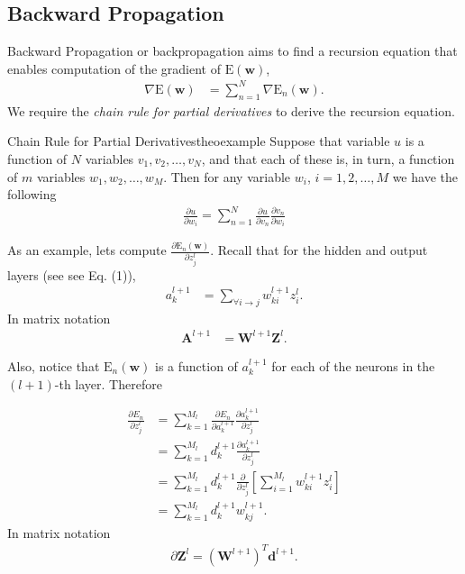 \documentclass{tufte-handout}
\begin{document}
\subsection{Backward Propagation}

Backward Propagation or backpropagation aims to find a recursion equation that enables computation of the gradient of $\mathrm E(\mathbf w)$, 
\begin{align*}
\nabla \mathrm E(\mathbf w) &=  \sum_{n=1}^N \nabla  \mathrm E_n(\mathbf w).
\end{align*}
We require the {\em chain rule for partial derivatives} to derive the recursion equation. 

\begin{mybox}{Chain Rule for Partial Derivatives}{theoexample}
Suppose that variable $u$ is a function of $N$ variables $v_1, v_2, \dots, v_N$, and that each of these is, in turn, a function of 
$m$ variables  $w_1, w_2, \dots, w_M$. Then for any variable $w_i$, $i=1,2,\dots,M$ we have the following
\begin{align*}
\frac{\partial u}{\partial w_i} = \sum_{n=1}^N \frac{\partial u}{\partial v_n}\frac{\partial v_n}{\partial w_i}
\end{align*}
\end{mybox}

As an example, lets compute $\frac{\partial \mathrm E_n(\mathbf w)}{\partial z_j^{l}} $. Recall that for the hidden and output layers   (see see Eq. (1)),
\begin{align*}
a_k^{l+1} &= \sum_{\forall i \rightarrow j} w^{l+1}_{ki}z^{l}_i. 
\end{align*}
In matrix notation
\begin{align*}
\mathbf A^{l+1}&= 	\mathbf W^{l+1} \mathbf  Z^{l}.
\end{align*}


Also, notice that $\mathrm E_n(\mathbf w)$ is a function of $a_k^{l+1} $
for each of the neurons in the $(l+1)$-th layer.  Therefore

\begin{align}
\frac{\partial E_n}{\partial z_j^{l}} &= \sum_{k=1}^{M_{l}} \frac{\partial E_n}{\partial  a_k^{l+1}} \frac{\partial a_k^{l+1}}{\partial z_j^{l}}\nonumber\\
&= \sum_{k=1}^{M_{l}} d_{k}^{l+1} \frac{\partial a_k^{l+1}}{\partial z_j^{l}}\nonumber\\
&= \sum_{k=1}^{M_{l}} d_{k}^{l+1} \frac{\partial}{\partial z_j^{l}} \left[ \sum_{i=1}^{M_{l}} w_{ki}^{l+1}z_i^{l} \right] \nonumber\\
&= \sum_{k=1}^{M_{l}} d_{k}^{l+1} w_{kj}^{l+1}.
\end{align}
In matrix notation
\begin{align*}
\partial \mathbf Z^l = (\mathbf W^{l+1})^T  \mathbf d^{l+1}.
\end{align*}
\end{document}

